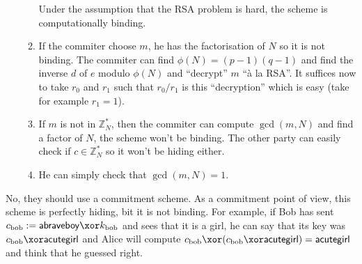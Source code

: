 \begin{solution}
\begin{enumerate}
\begin{enumerate}
			Under the assumption that the RSA problem is hard, the scheme is computationally binding.
			\item
			If the commiter choose $m$, he has the factorisation of $N$ so it is not binding.
			The commiter can find $\phi(N)=(p-1)(q-1)$ and find the inverse $d$ of $e$ modulo $\phi(N)$
			and ``decrypt'' $m$ ``à la RSA''.
			It suffices now to take $r_0$ and $r_1$ such that $r_{0}/r_{1}$ is this ``decryption'' which is easy (take for example $r_1 = 1$).
			\item
			If $m$ is not in $\mathbb{Z}_N^*$, then the commiter can compute $\gcd(m, N)$ and find a factor of $N$, the scheme won't be binding.
			The other party can easily check if $c \in \mathbb{Z}_N^*$ so it won't be hiding either.
			\item
			He can simply check that $\gcd(m, N) = 1$.
		\end{enumerate}
	\end{enumerate}
\end{solution}

\begin{solution}
	No, they should use a commitment scheme.
	As a commitment point of view, this scheme is perfectly hiding, bit it is not binding.
	For example, if Bob has sent $c_{\text{bob}} := \mathsf{abraveboy} \xor k_{\text{bob}}$ and sees that it is a girl,
	he can say that its key was $c_{\text{bob}} \xor \mathsf{acutegirl}$ and Alice will
	compute $c_{\text{bob}} \xor (c_{\text{bob}} \xor \mathsf{acutegirl}) = \mathsf{acutegirl}$ and think that he guessed right.
\end{solution}

